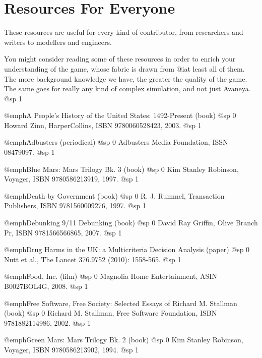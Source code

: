 \section{Resources For Everyone}
These resources are useful for every kind of contributor, from researchers and writers to modellers and engineers.

You might consider reading some of these resources in order to enrich your understanding of the game, whose fabric is drawn from @i{at least} all of them. The more background knowledge we have, the greater the quality of the game. The same goes for really any kind of complex simulation, and not just Avaneya.
@sp 1

\itemize

\item
@emph{A People's History of the United States: 1492-Present} (book)
@sp 0
Howard Zinn, HarperCollins, ISBN 9780060528423, 2003.
@sp 1

\item
@emph{Adbusters} (periodical)
@sp 0
Adbusters Media Foundation, ISSN 08479097.
@sp 1

\item
@emph{Blue Mars: Mars Trilogy Bk. 3} (book)
@sp 0
Kim Stanley Robinson, Voyager, ISBN 9780586213919, 1997.
@sp 1

\item
@emph{Death by Government} (book)
@sp 0
R. J. Rummel, Transaction Publishers, ISBN 9781560009276, 1997.
@sp 1

\item
@emph{Debunking 9/11 Debunking} (book)
@sp 0
David Ray Griffin, Olive Branch Pr, ISBN 9781566566865, 2007.
@sp 1

\item
@emph{Drug Harms in the UK: a Multicriteria Decision Analysis} (paper)
@sp 0
Nutt et al., The Lancet 376.9752 (2010): 1558-565.
@sp 1

\item
@emph{Food, Inc.} (film)
@sp 0
Magnolia Home Entertainment, ASIN B0027BOL4G, 2008.
@sp 1

\item
@emph{Free Software, Free Society: Selected Essays of Richard M. Stallman} (book)
@sp 0
Richard M. Stallman, Free Software Foundation, ISBN 9781882114986, 2002.
@sp 1

\item
@emph{Green Mars: Mars Trilogy Bk. 2} (book)
@sp 0
Kim Stanley Robinson, Voyager, ISBN 9780586213902, 1994.
@sp 1


